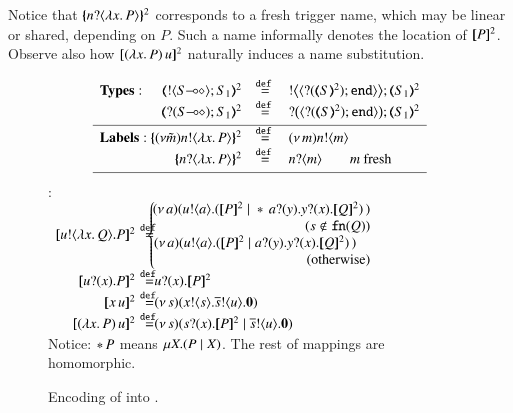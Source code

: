 \smallskip 
\noi 
Notice that $\{\!\!\{n ? \langle \lambda  x.\,P \rangle \}\!\!\}^2$ corresponds to a fresh trigger name, which may 
be linear or shared, depending on $P$. Such a name informally denotes the location of $[\!\![P]\!\!]^2$. 
Observe also how $[\!\![(\lambda x.\,P)\, {u}]\!\!]^2$ naturally induces a name substitution.
\smallskip 
\begin{figure}[t]
\[
\begin{array}{l}
	\begin{array}{rcl}
\noindent{\bf Types:}\hspace{0.5cm} 
		\tmap{\btout{\lhot{S}}S_1}{2} & \defeq & \bbtout{\chtype{\btinp{\tmap{S}{2}}\tinact}}\tmap{S_1}{2} \\
		\tmap{\btinp{\lhot{S}}S_1}{2} & \defeq & \bbtinp{\chtype{\btinp{\tmap{S}{2}}\tinact}}\tmap{S_1}{2} 
\\[1mm]
\hline
\noindent{\bf Labels:}\ 
		\mapa{(\nu \tilde{m})\bactout{n}{\abs{ x}{P}} }^2  & \defeq & \news{m} \bactout{n}{m} \\
		\mapa{\bactinp{n}{\abs{ x}{P}} }^2 &  \defeq & \bactinp{n}{m}
\quad \quad m \text{ fresh}
\\[1mm]
\hline
\end{array}
\end{array}
\]
\hspace{4mm}{\bf Terms} :\\
\noi$
\begin{array}{rcll}
		\pmap{\bout{u}{\abs{x}{Q}} P}{2} &\!\!\!\! \defeq \!\!\!\!\!\!\!\!&\!\!\!  \left\{
		\begin{array}{r}
		\!\!\!\!	\newsp{a}{\bout{u}{a} (\pmap{P}{2} \Par \repl{} \binp{a}{y} \binp{y}{x} \pmap{Q}{2})\,}\\
                  (s \notin \fn{Q}) \\
		\!\!\!\!	\newsp{a}{\bout{u}{a} (\pmap{P}{2} \Par \binp{a}{y} \binp{y}{x} \pmap{Q}{2})\,}\quad\\
            \textrm{(otherwise)} %
		\end{array}
		\right.
		\\
\pmap{\binp{u}{x} P}{2} &\!\!\!\! \defeq \!\!\!\! \!\!\!\! &  \binp{u}{x} \pmap{P}{2}
\\
\pmap{\appl{x}{u}}{2} & \!\!\!\! \defeq \!\!\!\! \!\!\!\! & \newsp{s}{\bout{x}{s} \bout{\dual{s}}{u} \inact} \\
\pmap{\appl{(\abs{x}{P})}{u}}{2} & \!\!\!\! \defeq \!\!\!\! \!\!\!\! & %
\newsp{s}{\binp{s}{x} \pmap{P}{2} \Par \bout{\dual{s}}{u} \inact}
	\end{array}
$\\[3mm]
{\small Notice: $\ast\,{} P$ means $\mu X. (P \;|\; X)$.
The rest of mappings are homomorphic.}\\ 
	\caption{
Encoding of \HOp into \sessp.
\label{f:enc:ho_to_sessp}
}
\Hlinefig
\end{figure}

